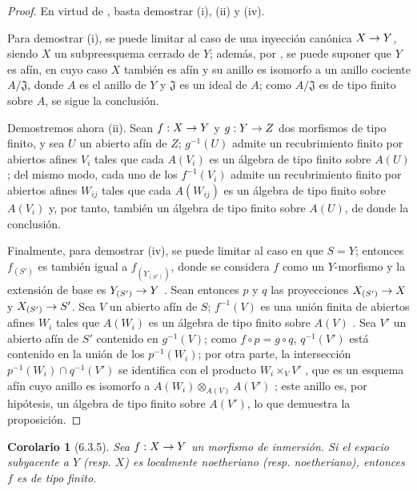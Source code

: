\documentclass[oneside]{amsart}
\theoremstyle{ega-env-style}
\theoremstyle{ega-thm-env-style}
\newtheorem*{corollary}{Corolario}
\theoremstyle{ega-defn-env-style}
\renewcommand{\to}{\mathchoice{\longrightarrow}{\rightarrow}{\rightarrow}{\rightarrow}}
\newcommand{\oldpage}[2][]{{\marginnote{\normalfont{\textbf{#1}~|~#2}}}\ignorespaces}
\let\EGAOriginalLabel\label
\renewcommand{\label}[1]{\phantomsection\EGAOriginalLabel{#1}}
\begin{document}
\begin{proof}
En virtud de , basta demostrar (i), (ii) y (iv).

Para demostrar (i), se puede limitar al caso de una inyección canónica $X\to Y$, siendo $X$ un subpreesquema cerrado de $Y$;
además, por , se puede suponer que $Y$ es afín, en cuyo caso $X$ también es afín  y su anillo es isomorfo a un anillo cociente $A/\mathfrak{J}$, donde $A$ es el anillo de $Y$ y $\mathfrak{J}$ es un ideal de $A$;
como $A/\mathfrak{J}$ es de tipo finito sobre $A$, se sigue la conclusión.

Demostremos ahora (ii).
Sean $f:X\to Y$ y $g:Y\to Z$ dos morfismos de tipo finito, y sea $U$ un abierto afín de $Z$;
$g^{-1}(U)$ admite un recubrimiento finito por abiertos afines $V_i$ tales que cada $A(V_i)$ es un álgebra de tipo finito sobre $A(U)$ ;
del mismo modo,
\oldpage[I]{146}
cada uno de los $f^{-1}(V_i)$ admite un recubrimiento finito por abiertos afines $W_{ij}$ tales que cada $A(W_{ij})$ es un álgebra de tipo finito sobre $A(V_i)$ y, por tanto, también un álgebra de tipo finito sobre $A(U)$, de donde la conclusión.

Finalmente, para demostrar (iv), se puede limitar al caso en que $S=Y$;
entonces $f_{(S')}$ es también igual a $f_{(Y_{(S')})}$, donde se considera $f$ como un $Y$-morfismo y la extensión de base es $Y_{(S')}\to Y$ .
Sean entonces $p$ y $q$ las proyecciones $X_{(S')}\to X$ y $X_{(S')}\to S'$.
Sea $V$ un abierto afín de $S$;
$f^{-1}(V)$ es una unión finita de abiertos afines $W_i$ tales que $A(W_i)$ es un álgebra de tipo finito sobre $A(V)$ .
Sea $V'$ un abierto afín de $S'$ contenido en $g^{-1}(V)$;
como $f\circ p=g\circ q$, $q^{-1}(V')$ está contenido en la unión de los $p^{-1}(W_i)$;
por otra parte, la intersección $p^{-1}(W_i)\cap q^{-1}(V')$ se identifica con el producto $W_i\times_V V'$ , que es un esquema afín cuyo anillo es isomorfo a $A(W_i)\otimes_{A(V)}A(V')$ ;
este anillo es, por hipótesis, un álgebra de tipo finito sobre $A(V')$, lo que demuestra la proposición.
\end{proof}

\begin{corollary}[6.3.5]
\label{I.6.3.5}
Sea $f:X\to Y$ un morfismo de inmersión.
Si el espacio subyacente a $Y$ \textup{(resp. $X$)} es localmente noetheriano \textup{(resp.} noetheriano), entonces $f$ es de tipo finito.
\end{corollary}
\end{document}
